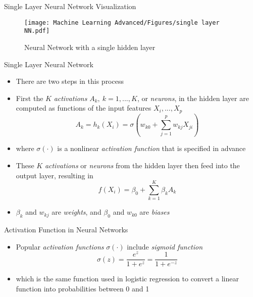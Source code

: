 \documentclass[aspectratio=1610,12pt,xcolor=dvipsnames]{beamer}
\begin{document}
\begin{frame}{Single Layer Neural Network Visualization}

\begin{figure}
    \centering
    \texttt{[image: Machine Learning Advanced/Figures/single layer NN.pdf]}
    \caption{Neural Network with a single hidden layer}
    \label{fig:single_layer_NN}
\end{figure}
\end{frame}

\begin{frame}{Single Layer Neural Network}

\begin{itemize}
    \item There are two steps in this process
    \item First the $K$ \textit{activations} $A_k, \: k=1,...,K$, or \textit{neurons}, in the hidden layer are computed as functions of the input features $X_i,...,X_p$
    \[
    A_k = h_k(X_i) = \sigma \left( w_{k0} + \sum_{j=1}^p w_{kj} X_{ji} \right)
    \]
    \item where $\sigma(\cdot)$ is a nonlinear \textit{activation function} that is specified in advance \pause
    \item These $K$ \textit{activations} or \textit{neurons} from the hidden layer then feed into the output layer, resulting in
    \[
    f(X_i) = \beta_0 + \sum_{k=1}^{K} \beta_k A_k
    \]
    \item $\beta_k$ and $w_{kj}$ are \textit{weights}, and $\beta_0$ and $w_{k0}$ are \textit{biases}
\end{itemize}
\end{frame}

\begin{frame}{Activation Function in Neural Networks}

\begin{itemize}
    \item Popular \textit{activation functions} $\sigma(\cdot)$ include \textit{sigmoid function}
    \[
    \sigma(z) = \frac{e^z}{1+e^z} = \frac{1}{1+e^{-z}}
    \]
    \item which is the same function used in logistic regression to convert a linear function into probabilities between 0 and 1
    \end{itemize}
\end{frame}
\end{document}
